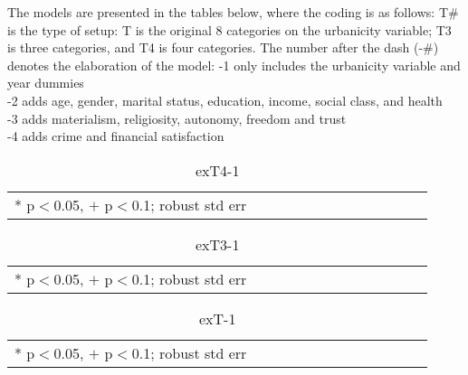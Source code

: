 \documentclass[11pt, letterpaper]{article}
\begin{document}
\begin{spacing}{1.4}
The models are presented in the tables below, where the coding is as follows:
T\# is the type of setup: T is the original 8 categories on the urbanicity
variable; T3 is three categories, and T4 is four categories. 
The number after the dash (-\#) denotes the elaboration of the model:
-1 only includes the urbanicity variable and year dummies\\
-2 adds  age, gender, marital status,  education, income, social class, and health\\
-3 adds materialism, religiosity, autonomy, freedom and trust\\
-4 adds crime and financial satisfaction


\begin{spacing}{.9} \begin{table}[H]\centering  \label{exT4-1} \begin{scriptsize} \begin{tabular}{p{1.0in}p{.5in}p{.5in}p{.5in}p{.5in}p{.5in}p{.5in}p{.5in}p{.5in}p{.5in}p{.5 in}p{.5in}p{.5 in}}\hline  \hline   * p$<$0.05, $+$ p$<$0.1; robust std err \end{tabular}\end{scriptsize}\caption{exT4-1}\end{table} \end{spacing}

\begin{spacing}{.9} \begin{table}[H]\centering  \label{exT3-1} \begin{scriptsize} \begin{tabular}{p{1.0in}p{.5in}p{.5in}p{.5in}p{.5in}p{.5in}p{.5in}p{.5in}p{.5in}p{.5in}p{.5 in}p{.5in}p{.5 in}}\hline  \hline   * p$<$0.05, $+$ p$<$0.1; robust std err \end{tabular}\end{scriptsize}\caption{exT3-1}\end{table} \end{spacing}

\begin{spacing}{.9} \begin{table}[H]\centering  \label{exT-1} \begin{scriptsize} \begin{tabular}{p{1.0in}p{.5in}p{.5in}p{.5in}p{.5in}p{.5in}p{.5in}p{.5in}p{.5in}p{.5in}p{.5 in}p{.5in}p{.5 in}}\hline  \hline   * p$<$0.05, $+$ p$<$0.1; robust std err \end{tabular}\end{scriptsize}\caption{exT-1}\end{table} \end{spacing}



\end{spacing}
\end{document}
